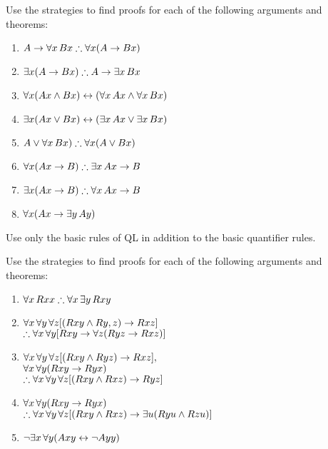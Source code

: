 \practiceproblems
\problempart
Use the strategies to find proofs for each of the following arguments and theorems:
\begin{enumerate}
\item $A \eif \forall x\,\atom{B}{x} \therefore \forall x(A \eif \atom{B}{x})$
\item $\exists x(A \eif \atom{B}{x}) \therefore A \eif \exists x\, \atom{B}{x}$
\item $\forall x(\mathord{A}x \wedge \mathord{B}x) \leftrightarrow (\forall x\,\mathord{A}x \wedge \forall x\,\mathord{B}x)$
\item $\exists x(\mathord{A}x \vee \mathord{B}x) \leftrightarrow (\exists x\,\mathord{A}x \vee \exists x\,\mathord{B}x)$
\item $A \eor \forall x\,\atom{B}{x}) \therefore \forall x(A \eor \atom{B}{x})$
\item $\forall x(\atom{A}{x} \eif B) \therefore \exists x\,\atom{A}{x} \eif B$
\item $\exists x(\atom{A}{x} \eif B) \therefore \forall x\,\atom{A}{x} \eif B$
\item $\forall x(\mathord{A}x \rightarrow \exists y\,\mathord{A}y)$
\end{enumerate}
Use only the basic rules of QL in addition to the basic quantifier rules.

\problempart
Use the strategies to find proofs for each of the following arguments and theorems:
\begin{enumerate}
\item $\forall x\,\atom{R}{xx} \therefore \forall x\,\exists y\,\atom{R}{xy}$
\item $\forall x\,\forall y\,\forall z[(\mathord{R}xy \wedge \mathord{R}y,z) \rightarrow \mathord{R}xz]$ \\
$\therefore \forall x\,\forall y[\atom{R}{xy} \eif \forall z(\atom{R}{yz} \eif \atom{R}{xz})]$
\item $\forall x\,\forall y\,\forall z[(\mathord{R}xy \wedge \mathord{R}yz) \rightarrow \mathord{R}xz],$\\ $\forall x\,\forall y(\mathord{R}xy \rightarrow \mathord{R}yx)$ \\ $\therefore \forall x\,\forall y\,\forall z[(\atom{R}{xy} \eand \atom{R}{xz}) \eif \atom{R}{yz}]$
\item $\forall x\,\forall y(\mathord{R}xy \rightarrow \mathord{R}yx)$ \\$\therefore \forall x\,\forall y\,\forall z[(\atom{R}{xy} \eand \atom{R}{xz}) \eif \exists u(\atom{R}{yu} \eand \atom{R}{zu})]$
\item $\neg \exists x\,\forall y (\mathord{A}xy \leftrightarrow \lnot\mathord{A}yy)$
\end{enumerate}

